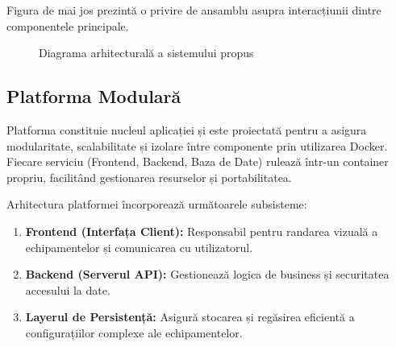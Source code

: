 \documentclass[12pt,a4paper]{article}
\begin{document}
Figura de mai jos prezintă o privire de ansamblu asupra interacțiunii dintre componentele principale.

\begin{figure}[H]
    \centering
    \caption{Diagrama arhitecturală a sistemului propus}
    \label{fig:arhitectura}
\end{figure}

\subsection{Platforma Modulară}
\label{subsec:platforma}

\hspace{1em}Platforma constituie nucleul aplicației și este proiectată pentru a asigura modularitate, scalabilitate și izolare între componente prin utilizarea Docker. Fiecare serviciu (Frontend, Backend, Baza de Date) rulează într-un container propriu, facilitând gestionarea resurselor și portabilitatea.

Arhitectura platformei încorporează următoarele subsisteme:
\begin{enumerate}
    \item \textbf{Frontend (Interfața Client):} Responsabil pentru randarea vizuală a echipamentelor și comunicarea cu utilizatorul.
    \item \textbf{Backend (Serverul API):} Gestionează logica de business și securitatea accesului la date.
    \item \textbf{Layerul de Persistență:} Asigură stocarea și regăsirea eficientă a configurațiilor complexe ale echipamentelor.
\end{enumerate}
\end{document}
